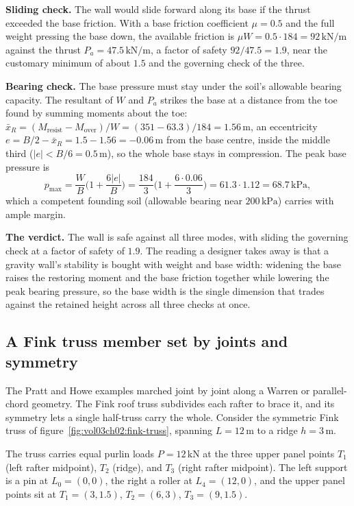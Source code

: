 \textbf{Sliding check.} The wall would slide forward along its base if the
thrust exceeded the base friction. With a base friction coefficient
$\mu = 0.5$ and the full weight pressing the base down, the available
friction is $\mu W = 0.5 \cdot 184 = 92\,\text{kN}/\text{m}$ against the
thrust $P_a = 47.5\,\text{kN}/\text{m}$, a factor of safety
$92 / 47.5 = 1.9$, near the customary minimum of about $1.5$ and the
governing check of the three.

\textbf{Bearing check.} The base pressure must stay under the soil's
allowable bearing capacity. The resultant of $W$ and $P_a$ strikes the base
at a distance from the toe found by summing moments about the toe:
$\bar{x}_R = (M_{\text{resist}} - M_{\text{over}})/W = (351 - 63.3)/184 =
1.56\,\si{\meter}$, an eccentricity $e = B/2 - \bar{x}_R = 1.5 - 1.56 =
-0.06\,\si{\meter}$ from the base centre, inside the middle third
($|e| < B/6 = 0.5\,\si{\meter}$), so the whole base stays in compression.
The peak base pressure is
\[
p_{\max} = \frac{W}{B}\Big(1 + \frac{6|e|}{B}\Big)
= \frac{184}{3}\Big(1 + \frac{6 \cdot 0.06}{3}\Big)
= 61.3 \cdot 1.12 = 68.7\,\text{kPa},
\]
which a competent founding soil (allowable bearing near
$200\,\text{kPa}$) carries with ample margin.

\textbf{The verdict.} The wall is safe against all three modes, with sliding
the governing check at a factor of safety of $1.9$. The reading a designer
takes away is that a gravity wall's stability is bought with weight and base
width: widening the base raises the restoring moment and the base friction
together while lowering the peak bearing pressure, so the base width is the
single dimension that trades against the retained height across all three
checks at once.

\subsection{A Fink truss member set by joints and symmetry}

The Pratt and Howe examples marched joint by joint along a Warren or
parallel-chord geometry. The Fink roof truss subdivides each rafter to brace
it, and its symmetry lets a single half-truss carry the whole. Consider the
symmetric Fink truss of figure~\ref{fig:vol03ch02:fink-truss}, spanning
$L = 12\,\si{\meter}$ to a ridge $h = 3\,\si{\meter}$.



The truss carries equal purlin
loads $P = 12\,\text{kN}$ at the three upper panel points $T_1$ (left rafter
midpoint), $T_2$ (ridge), and $T_3$ (right rafter midpoint). The left support
is a pin at $L_0 = (0,0)$, the right a roller at $L_4 = (12,0)$, and the upper
panel points sit at $T_1 = (3, 1.5)$, $T_2 = (6, 3)$, $T_3 = (9, 1.5)$.


